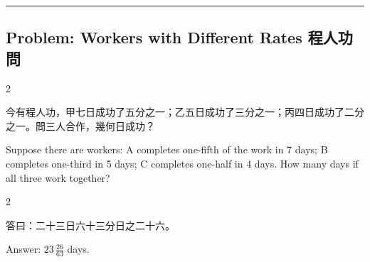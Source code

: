 \documentclass[10pt,a4paper]{article}
\newcommand{\longline}{\noindent\rule{\textwidth}{0.4pt}}
\begin{document}
\vspace{0.3cm}
\longline
\vspace{0.3cm}

\subsection{Problem: Workers with Different Rates 程人功問}

\begin{paracol}{2}

\begin{leftcolumn*}
\begin{problembi}
今有程人功，甲七日成功了五分之一；乙五日成功了三分之一；丙四日成功了二分之一。問三人合作，幾何日成功？
\end{problembi}
\end{leftcolumn*}

\begin{rightcolumn*}
\begin{problembi}
Suppose there are workers: A completes one-fifth of the work in 7 days; B completes one-third in 5 days; C completes one-half in 4 days. How many days if all three work together?
\end{problembi}
\end{rightcolumn*}

\end{paracol}

\begin{paracol}{2}

\begin{leftcolumn*}
\begin{answerbi}[\textbf{答}]
答曰：二十三日六十三分日之二十六。
\end{answerbi}
\end{leftcolumn*}

\begin{rightcolumn*}
\begin{answerbi}
Answer: $23\,\frac{26}{63}$ days.
\end{answerbi}
\end{rightcolumn*}

\end{paracol}
\end{document}
